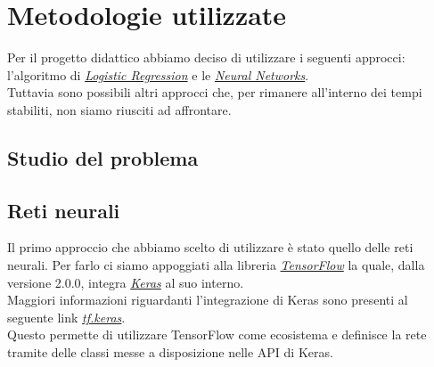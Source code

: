 \section{Metodologie utilizzate}
Per il progetto didattico abbiamo deciso di utilizzare i seguenti approcci: l'algoritmo di \href{https://en.wikipedia.org/wiki/Logistic_regression}{\textit{Logistic Regression}} e le \href{https://en.wikipedia.org/wiki/Neural_network}{\textit{Neural Networks}}.\\
Tuttavia sono possibili altri approcci che, per rimanere all'interno dei tempi stabiliti, non siamo riusciti ad affrontare. 

\subsection{Studio del problema}
\subsection{Reti neurali}
Il primo approccio che abbiamo scelto di utilizzare è stato quello delle reti neurali.
Per farlo ci siamo appoggiati alla libreria \href{https://www.tensorflow.org/}{\textit{TensorFlow}} la quale, dalla versione 2.0.0, integra \href{https://keras.io/}{\textit{Keras}} al suo interno.\\
Maggiori informazioni riguardanti l'integrazione di Keras sono presenti al seguente link \href{https://www.tensorflow.org/guide/keras}{\textit{tf.keras}}.\\ 
Questo permette di utilizzare TensorFlow come ecosistema e definisce la rete tramite delle classi messe a disposizione nelle API di Keras.\\
